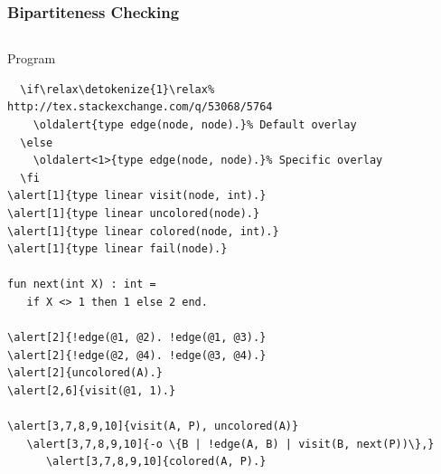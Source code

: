 \documentclass{beamer}
\let\oldalert\alert
\renewcommand{\alert}[2][]{%
  \if\relax\detokenize{#1}\relax%
    \oldalert{#2}%
  \else
    \oldalert<#1>{#2}%
  \fi}
\begin{document}
\begin{frame}[fragile]
  \frametitle{Bipartiteness Checking}
  \begin{columns}[t]
     \begin{block}{Program}
       \begin{Verbatim}[fontsize=\tiny,commandchars=\\\{\},frame=single]
\alert[1]{type edge(node, node).}
\alert[1]{type linear visit(node, int).}
\alert[1]{type linear uncolored(node).}
\alert[1]{type linear colored(node, int).}
\alert[1]{type linear fail(node).}

fun next(int X) : int =
   if X <> 1 then 1 else 2 end.

\alert[2]{!edge(@1, @2). !edge(@1, @3).}
\alert[2]{!edge(@2, @4). !edge(@3, @4).}
\alert[2]{uncolored(A).}
\alert[2,6]{visit(@1, 1).}

\alert[3,7,8,9,10]{visit(A, P), uncolored(A)}
   \alert[3,7,8,9,10]{-o \{B | !edge(A, B) | visit(B, next(P))\},}
      \alert[3,7,8,9,10]{colored(A, P).}


\end{Verbatim}
\end{block}
\end{columns}
\end{frame}
\end{document}
